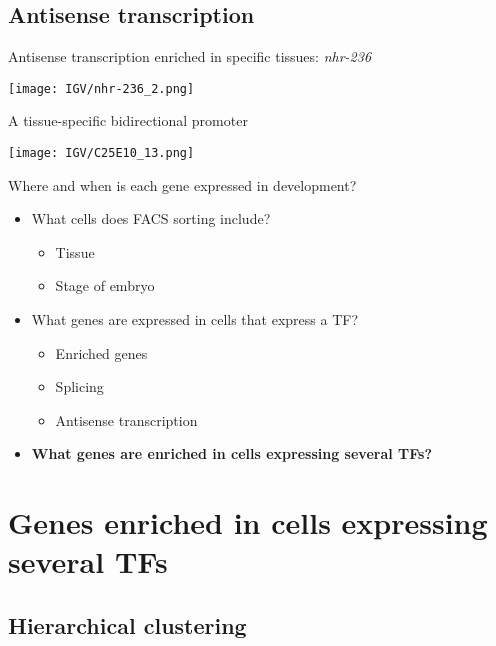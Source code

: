\documentclass[serif,9pt]{beamer}
\begin{document}
\subsection{Antisense transcription}

\begin{frame}{Antisense transcription enriched in specific tissues: {\em nhr-236}}

\texttt{[image: IGV/nhr-236\_2.png]}

\end{frame}

\begin{frame}{A tissue-specific bidirectional promoter}

\texttt{[image: IGV/C25E10\_13.png]}

\end{frame}

\begin{frame}{Where and when is each gene expressed in development?}
\begin{itemize}
\item What cells does FACS sorting include?
\begin{itemize}
\item Tissue
\item Stage of embryo
\end{itemize}
\item What genes are expressed in cells that express a TF?
\begin{itemize}
\item Enriched genes
\item Splicing
\item Antisense transcription
\end{itemize}
\item {\bf What genes are enriched in cells expressing several TFs?}
\end{itemize}
\end{frame}

\section{Genes enriched in cells expressing several TFs}

\subsection{Hierarchical clustering}
\end{document}
